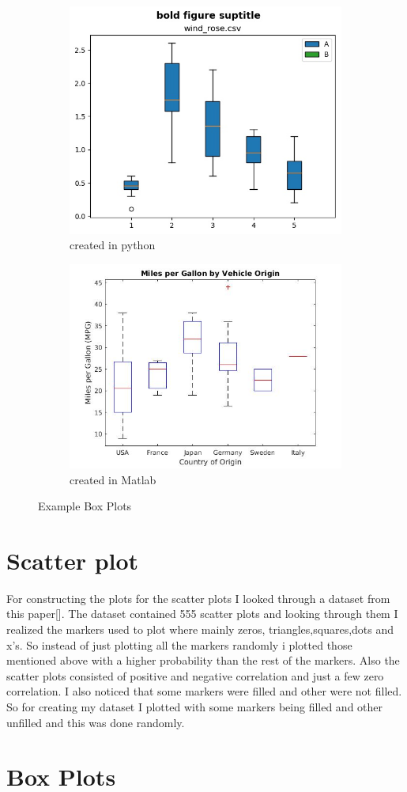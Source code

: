 \documentclass[12pt, a4paper,oneside]{report}
\begin{document}
\begin{figure}
	\begin{subfigure}{.5\textwidth}
		\centering
		\includegraphics[width=.8\linewidth]{box1}
		\caption{created in python}
		\label{fig:sfig1}
	\end{subfigure}%
	\begin{subfigure}{.5\textwidth}
		\centering
		\includegraphics[width=.8\linewidth]{box2}
		\caption{created in Matlab}
		\label{fig:sfig2}
	\end{subfigure}
	\caption{Example Box Plots}
	\label{fig:fig}
\end{figure}



\section{Scatter plot}
For constructing the plots for the scatter plots I looked through a dataset from this paper[]. The dataset contained 555
scatter plots and looking through them I realized the markers used to plot where mainly zeros, triangles,squares,dots and x's.
So instead of just plotting all the markers randomly i plotted those mentioned above with a higher probability than the rest of the markers.
Also the scatter plots consisted of positive and negative correlation and just a few zero correlation. 
I also noticed that some markers were filled and other were not filled. So for creating my dataset I plotted with some markers being filled and other unfilled and this was done randomly. 

\section{Box Plots}



\end{document}
